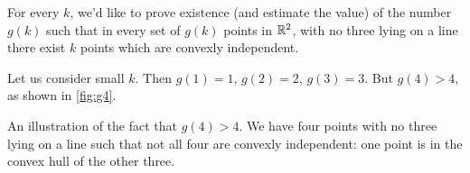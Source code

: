 For every $k$, we'd like to prove existence (and estimate the value) of the number $g(k)$ such that in every set of $g(k)$ points in $\mathbb{R}^2$, with no three lying on a line there exist $k$ points which are convexly independent.

Let us consider small $k$. Then $g(1)=1$, $g(2)=2$, $g(3)=3$. But $g(4) > 4$, as shown in \cref{fig:g4}.
\begin{marginfigure}[-1cm]
\begin{center}
\end{center}
\caption{An illustration of the fact that $g(4) > 4$. We have four points with no three lying on a line such that not all four are convexly independent: one point is in the convex hull of the other three.} \label{fig:g4}
\end{marginfigure}

